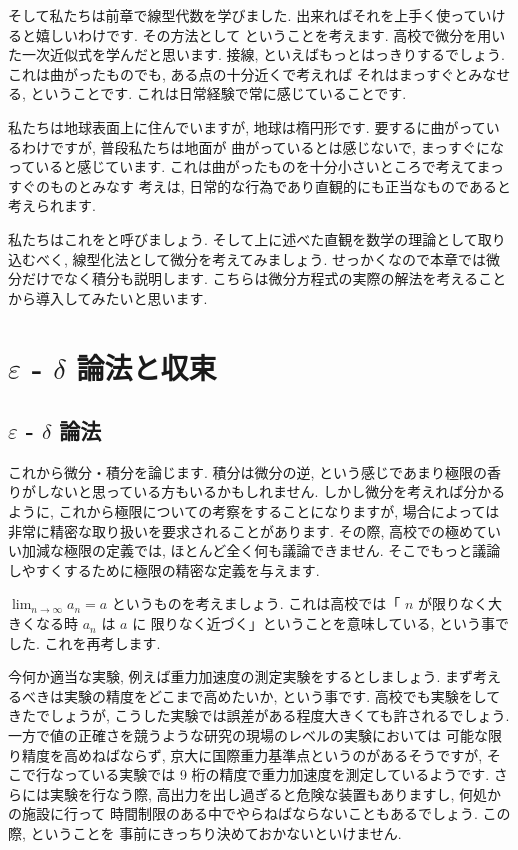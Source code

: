 \documentclass[openany, a4paper, oneside]{jsbook}
\theoremstyle{break}
\theoremstyle{breakdefn}
\begin{document}
そして私たちは前章で線型代数を学びました.
出来ればそれを上手く使っていけると嬉しいわけです.
その方法として
ということを考えます.
高校で微分を用いた一次近似式を学んだと思います.
接線, といえばもっとはっきりするでしょう.
これは曲がったものでも, ある点の十分近くで考えれば
それはまっすぐとみなせる, ということです.
これは日常経験で常に感じていることです.

私たちは地球表面上に住んでいますが, 地球は楕円形です.
要するに曲がっているわけですが, 普段私たちは地面が
曲がっているとは感じないで, まっすぐになっていると感じています.
これは曲がったものを十分小さいところで考えてまっすぐのものとみなす
考えは, 日常的な行為であり直観的にも正当なものであると考えられます.

私たちはこれをと呼びましょう.
そして上に述べた直観を数学の理論として取り込むべく,
線型化法として微分を考えてみましょう.
せっかくなので本章では微分だけでなく積分も説明します.
こちらは微分方程式の実際の解法を考えることから導入してみたいと思います.
\section{$\varepsilon$ - $\delta$ 論法と収束}

\subsection{$\varepsilon$ - $\delta$ 論法}


これから微分・積分を論じます.
積分は微分の逆, という感じであまり極限の香りがしないと思っている方もいるかもしれません.
しかし微分を考えれば分かるように, これから極限についての考察をすることになりますが,
場合によっては非常に精密な取り扱いを要求されることがあります.
その際, 高校での極めていい加減な極限の定義では, ほとんど全く何も議論できません.
そこでもっと議論しやすくするために極限の精密な定義を与えます.

 $\lim_{n \to \infty}a_n=a$ というものを考えましょう.
これは高校では「 $n$ が限りなく大きくなる時 $a_n$ は $a$ に
限りなく近づく」ということを意味している, という事でした.
これを再考します.

今何か適当な実験, 例えば重力加速度の測定実験をするとしましょう.
まず考えるべきは実験の精度をどこまで高めたいか, という事です.
高校でも実験をしてきたでしょうが,
こうした実験では誤差がある程度大きくても許されるでしょう.
一方で値の正確さを競うような研究の現場のレベルの実験においては
可能な限り精度を高めねばならず, 京大に国際重力基準点というのがあるそうですが,
そこで行なっている実験では 9 桁の精度で重力加速度を測定しているようです.
さらには実験を行なう際,
高出力を出し過ぎると危険な装置もありますし, 何処かの施設に行って
時間制限のある中でやらねばならないこともあるでしょう.
この際, ということを
事前にきっちり決めておかないといけません.
\end{document}
